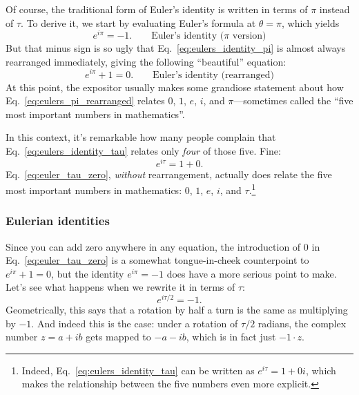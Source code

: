 Of course, the traditional form of Euler's identity is written in terms of $\pi$ instead of $\tau$. To derive it, we start by evaluating Euler's formula at $\theta = \pi$, which yields
\begin{equation}
\label{eq:eulers_identity_pi}
e^{i\pi} = -1. \qquad\mbox{Euler's identity ($\pi$ version)}
\end{equation}
But that minus sign is so ugly that Eq.~\eqref{eq:eulers_identity_pi} is almost always rearranged immediately, giving the following ``beautiful'' equation:
\begin{equation}
\label{eq:eulers_pi_rearranged}
e^{i\pi} + 1 = 0. \qquad\mbox{Euler's identity (rearranged)}
\end{equation}
At this point, the expositor usually makes some grandiose statement about how Eq.~\eqref{eq:eulers_pi_rearranged} relates $0$, $1$, $e$, $i$, and $\pi$---sometimes called the ``five most important numbers in mathematics''.

In this context, it's remarkable how many people complain that Eq.~\eqref{eq:eulers_identity_tau} relates only \emph{four} of those five. Fine:
\begin{equation}
\label{eq:euler_tau_zero}
e^{i\tau} = 1 + 0.
\end{equation}
Eq.~\eqref{eq:euler_tau_zero}, \emph{without} rearrangement, actually does relate the five most important numbers in mathematics: $0$, $1$, $e$, $i$, and $\tau$.\footnote{Indeed, Eq.~\eqref{eq:eulers_identity_tau} can be written as $e^{i\tau} = 1 + 0i$, which makes the relationship between the five numbers even more explicit.}

      \subsubsection{Eulerian identities} %
      \label{sec:eulerian_identities}

Since you can add zero anywhere in any equation, the introduction of $0$ in Eq.~\eqref{eq:euler_tau_zero} is a somewhat tongue-in-cheek counterpoint to $e^{i\pi} + 1 = 0$, but the identity $e^{i\pi} = -1$ does have a more serious point to make. Let's see what happens when we rewrite it in terms of $\tau$:
\[
e^{i\tau/2} = -1.
\]
Geometrically, this says that a rotation by half a turn is the same as multiplying by $-1$. And indeed this is the case: under a rotation of $\tau/2$ radians, the complex number $z = a + ib$ gets mapped to $-a - ib$, which is in fact just $-1\cdot z$.

